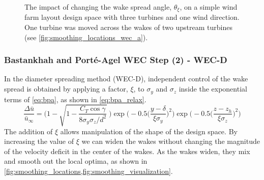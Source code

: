 \documentclass[a4paper]{jpconf}
\begin{document}
\begin{figure}[ht]
\begin{minipage}[t]{0.52\textwidth}
		\caption{The impact of changing the wake spread angle, $\theta_\xi$, on a simple wind farm layout design space with three turbines and one wind direction. One turbine was moved across the wakes of two upstream turbines (see \cref{fig:smoothing_locations_wec_a}). }
		\label{fig:smoothing_bpa_wec_a}
	\end{minipage} 
\end{figure}

\subsubsection{Bastankhah and Port\'e-Agel WEC Step (2) - WEC-D}
In the diameter spreading method (WEC-D), independent control of the wake spread is obtained by applying a factor, $\xi$, to $\sigma_y$ and $\sigma_z$ inside the exponential terms of \cref{eq:bpa}, as shown in \cref{eq:bpa_relax}.
\begin{equation}
\frac{\Delta \bar{u}}{\bar{u}_{\infty}} = \Bigg(1-\sqrt{1-\frac{C_T \cos{\gamma}}{8 \sigma_y \sigma_z/d^2}}~\Bigg) \exp{\bigg(-0.5\Big(\frac{y-\delta}{\xi \sigma_y}\Big)^2\bigg)}\exp{\bigg(-0.5\Big(\frac{z-z_h}{\xi \sigma_z}\Big)^2\bigg)}
\label{eq:bpa_relax}
\end{equation}
The addition of $\xi$ allows manipulation of the shape of the design space. By increasing the value of $\xi$ we can widen the wakes without changing the magnitude of the velocity deficit in the center of the wakes. As the wakes widen, they mix and smooth out the local optima, as shown in \cref{fig:smoothing_locations,fig:smoothing_visualization}. 
%
\end{document}
